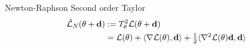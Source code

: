 
\begin{frame}{Newton-Raphson}
	Second order Taylor
	\begin{align*}
		\hat{\mathcal{L}}_{N}(\theta + \mathbf{d})
		&:= T^2_\theta \mathcal{L}(\theta + \mathbf{d})\\
		&= \mathcal{L}(\theta)
		+ \langle \nabla\mathcal{L}(\theta), \mathbf{d}\rangle
		+ \tfrac12 \langle \nabla^2\mathcal{L}(\theta) \mathbf{d}, \mathbf{d}\rangle
	\end{align*}
\end{frame}
